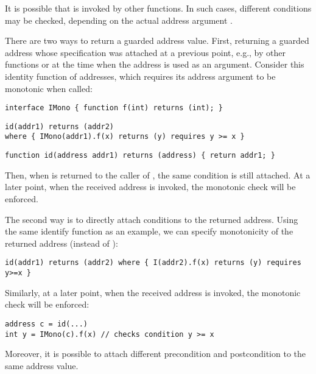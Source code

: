 It is possible that  is invoked by other functions. In such cases,
different conditions may be checked, depending on the actual address argument .

There are two ways to return a guarded address value. First,
returning a guarded address whose specification was attached at a previous point,
e.g., by other functions or at the time when the address is used as an argument.
Consider this identity function of addresses, which requires its address argument
to be monotonic when called: %
\begin{lstlisting}[language=Solidity]
interface IMono { function f(int) returns (int); }
\end{lstlisting}
\vspace{-0.25em}
\begin{lstlisting}[language=Consol]
id(addr1) returns (addr2) 
where { IMono(addr1).f(x) returns (y) requires y >= x }
\end{lstlisting}
\vspace{-0.25em}
\begin{lstlisting}[language=Solidity]
function id(address addr1) returns (address) { return addr1; }
\end{lstlisting}
Then, when  is returned to the caller of , the same condition is still attached.
At a later point, when the received address is invoked, the monotonic check
will be enforced.

The second way is to directly attach conditions to the returned address.
Using the same identify function as an example, we can specify monotonicity 
of the returned address  (instead of ):
\begin{lstlisting}[language=Consol]
id(addr1) returns (addr2) where { I(addr2).f(x) returns (y) requires y>=x }
\end{lstlisting}
Similarly, at a later point, when the received address is invoked, the monotonic check
will be enforced:
\begin{lstlisting}[language=Solidity]
address c = id(...)
int y = IMono(c).f(x) // checks condition y >= x
\end{lstlisting}
Moreover, it is possible to attach different precondition and postcondition
to the same address value.

